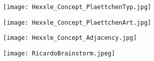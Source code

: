 \documentclass[../main.tex]{subfiles}
\begin{document}
	\begin{figure}[H]
		\centering
		\texttt{[image: Hexxle\_Concept\_PlaettchenTyp.jpg]}
		\caption{}
	\end{figure}

	\begin{figure}[H]
		\centering
		\texttt{[image: Hexxle\_Concept\_PlaettchenArt.jpg]}
		\caption{}
	\end{figure}

	\begin{figure}[H]
		\centering
		\texttt{[image: Hexxle\_Concept\_Adjacency.jpg]}
		\caption{}
	\end{figure}

	\begin{figure}[H]
		\centering
		\texttt{[image: RicardoBrainstorm.jpeg]}
		\caption{}
	\end{figure}
\end{document}
